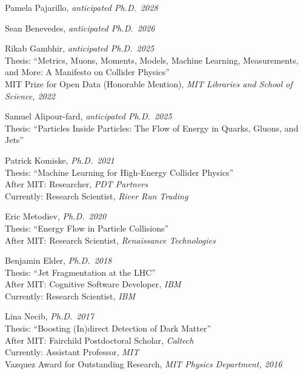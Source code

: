 \bbl

\item Pamela Pajarillo, \emph{anticipated Ph.D.~2028}

\item Sean Benevedes, \emph{anticipated Ph.D.~2026}

\item Rikab Gambhir, \emph{anticipated Ph.D.~2025}
\\ Thesis: ``Metrics, Muons, Moments, Models, Machine Learning, Measurements, and More: A Manifesto on Collider Physics''
\\ MIT Prize for Open Data (Honorable Mention), \emph{MIT Libraries and School of Science, 2022}

\item Samuel Alipour-fard, \emph{anticipated Ph.D.~2025}
\\ Thesis: ``Particles Inside Particles: The Flow of Energy in Quarks, Gluons, and Jets''

\item Patrick Komiske, \emph{Ph.D.~2021}
\\ Thesis: ``Machine Learning for High-Energy Collider Physics''
\\ After MIT: Researcher, \emph{PDT Partners}
\\ Currently: Research Scientist, \emph{River Run Trading}

\item Eric Metodiev, \emph{Ph.D.~2020}
\\ Thesis: ``Energy Flow in Particle Collisions''
\\ After MIT: Research Scientist, \emph{Renaissance Technologies}

\item Benjamin Elder, \emph{Ph.D.~2018}
\\ Thesis: ``Jet Fragmentation at the LHC''
\\ After MIT: Cognitive Software Developer, \emph{IBM}
\\ Currently: Research Scientist, \emph{IBM}

\item Lina Necib, \emph{Ph.D.~2017}
\\ Thesis: ``Boosting (In)direct Detection of Dark Matter''
\\ After MIT: Fairchild Postdoctoral Scholar, \emph{Caltech}
\\ Currently: Assistant Professor, \emph{MIT}
\\ Vazquez Award for Outstanding Research, \emph{MIT Physics Department, 2016}

